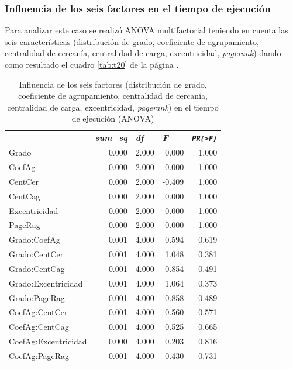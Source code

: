 \documentclass{article}
\begin{document}
\newpage

\subsubsection{Influencia de los seis factores en el tiempo de ejecución}
Para analizar este caso se realizó ANOVA multifactorial teniendo en cuenta las seis características (distribución de grado, coeficiente de agrupamiento, centralidad de cercanía, centralidad de carga, excentricidad, \textit{pagerank}) dando como resultado el cuadro \ref{tab:t20} de la página \pageref{tab:t20}.

\begin{table}[htbp]
  \centering
  \caption{Influencia de los seis factores (distribución de grado, coeficiente de agrupamiento, centralidad de cercanía, centralidad de carga, excentricidad, \textit{pagerank}) en el tiempo de ejecución (ANOVA)}
    \begin{tabular}{lrrrr}
          & \multicolumn{1}{l}{\textit{\textbf{sum\_sq}}} & \multicolumn{1}{l}{\textit{\textbf{df}}} & \multicolumn{1}{l}{\textit{\textbf{F}}} & \multicolumn{1}{l}{\textit{\textbf{\texttt{PR(>F)}}}} \\
    Grado & 0.000 & 2.000 & 0.000 & 1.000 \\
    CoefAg & 0.000 & 2.000 & 0.000 & 1.000 \\
    CentCer & 0.000 & 2.000 & -0.409 & 1.000 \\
    CentCag & 0.000 & 2.000 & 0.000 & 1.000 \\
    Excentricidad & 0.000 & 2.000 & 0.000 & 1.000 \\
    PageRag & 0.000 & 2.000 & 0.000 & 1.000 \\
    Grado:CoefAg & 0.001 & 4.000 & 0.594 & 0.619 \\
    Grado:CentCer & 0.001 & 4.000 & 1.048 & 0.381 \\
    Grado:CentCag & 0.001 & 4.000 & 0.854 & 0.491 \\
    Grado:Excentricidad & 0.001 & 4.000 & 1.064 & 0.373 \\
    Grado:PageRag & 0.001 & 4.000 & 0.858 & 0.489 \\
    CoefAg:CentCer & 0.001 & 4.000 & 0.560 & 0.571 \\
    CoefAg:CentCag & 0.001 & 4.000 & 0.525 & 0.665 \\
    CoefAg:Excentricidad & 0.000 & 4.000 & 0.203 & 0.816 \\
    CoefAg:PageRag & 0.001 & 4.000 & 0.430 & 0.731 \\

\end{tabular}
\end{table}
\end{document}

